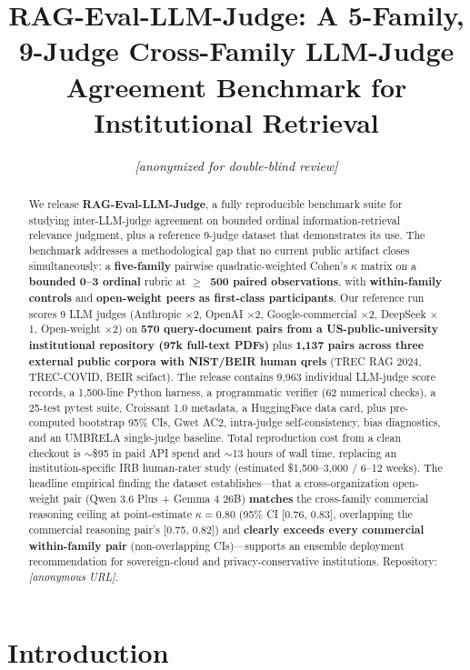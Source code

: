 \documentclass{article}
\title{\bfseries RAG-Eval-LLM-Judge: A 5-Family, 9-Judge Cross-Family LLM-Judge Agreement Benchmark for Institutional Retrieval}
\author{\textit{[anonymized for double-blind review]}}
\begin{document}
\maketitle

\begin{abstract}
We release \textbf{RAG-Eval-LLM-Judge}, a fully reproducible benchmark suite for studying inter-LLM-judge agreement on bounded ordinal information-retrieval relevance judgment, plus a reference 9-judge dataset that demonstrates its use. The benchmark addresses a methodological gap that no current public artifact closes simultaneously: a \textbf{five-family} pairwise quadratic-weighted Cohen's $\kappa$ matrix on a \textbf{bounded 0--3 ordinal} rubric at \textbf{$\geq$~500 paired observations}, with \textbf{within-family controls} and \textbf{open-weight peers as first-class participants}. Our reference run scores 9 LLM judges (Anthropic $\times$2, OpenAI $\times$2, Google-commercial $\times$2, DeepSeek $\times$1, Open-weight $\times$2) on \textbf{570 query-document pairs from a US-public-university institutional repository (97k full-text PDFs)} plus \textbf{1{,}137 pairs across three external public corpora with NIST/BEIR human qrels} (TREC RAG 2024, TREC-COVID, BEIR scifact). The release contains 9{,}963 individual LLM-judge score records, a 1{,}500-line Python harness, a programmatic verifier (62 numerical checks), a 25-test pytest suite, Croissant 1.0 metadata, a HuggingFace data card, plus pre-computed bootstrap 95\% CIs, Gwet AC2, intra-judge self-consistency, bias diagnostics, and an UMBRELA single-judge baseline. Total reproduction cost from a clean checkout is $\sim$\$95 in paid API spend and $\sim$13 hours of wall time, replacing an institution-specific IRB human-rater study (estimated \$1{,}500--3{,}000 / 6--12 weeks). The headline empirical finding the dataset establishes---that a cross-organization open-weight pair (Qwen 3.6 Plus + Gemma 4 26B) \textbf{matches} the cross-family commercial reasoning ceiling at point-estimate $\kappa = 0.80$ (95\% CI [0.76, 0.83], overlapping the commercial reasoning pair's [0.75, 0.82]) and \textbf{clearly exceeds every commercial within-family pair} (non-overlapping CIs)---supports an ensemble deployment recommendation for sovereign-cloud and privacy-conservative institutions. Repository: \emph{[anonymous URL]}.
\end{abstract}

\section{Introduction}\label{sec:intro}
\end{document}
